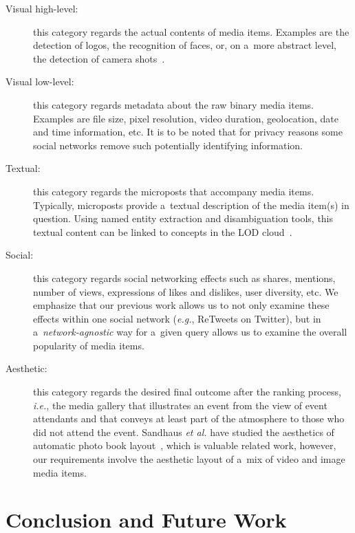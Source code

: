 \documentclass[runningheads,a4paper,11pt]{llncs}
\begin{document}
\begin{description}
\item[Visual high-level:]
this category regards the actual contents of media items.
Examples are the detection of logos, the recognition of faces, or, on a~more abstract level,
the detection of camera shots~\cite{Crowdsourcing2011}.

\item[Visual low-level:]
this category regards metadata about the raw binary media items.
Examples are file size, pixel resolution, video duration, geolocation,
date and time information, etc.
It is to be noted that for privacy reasons some social networks
remove such potentially identifying information.

\item[Textual:]
this category regards the microposts that accompany media items.
Typically, microposts provide a~textual description of the media item(s) in question.
Using named entity extraction and disambiguation tools,
this textual content can be linked to concepts in the LOD cloud~\cite{Facebook2011}.

\item[Social:]
this category regards social networking effects such as shares, mentions,
number of views, expressions of likes and dislikes, user diversity, etc.
We emphasize that our previous work allows us
to not only examine these effects within one social network (\emph{e.g.}, ReTweets on Twitter),
but in a~\emph{network-agnostic} way for a~given query allows us
to examine the overall popularity of media items.

\item[Aesthetic:]
this category regards the desired final outcome after the ranking process, \emph{i.e.},
the media gallery that illustrates an event from the view of event attendants and
that conveys at least part of the atmosphere to those who did not attend the event.
Sandhaus \emph{et al.} have studied the aesthetics of
automatic photo book layout~\cite{Photo2011}, which is valuable related work, however,
our requirements involve the aesthetic layout of a~mix of video and image media items.
\end{description}

\section{Conclusion and Future Work}

\renewcommand{\ttdefault}{cmvtt}
\renewcommand\UrlFont\tt



\end{document}
